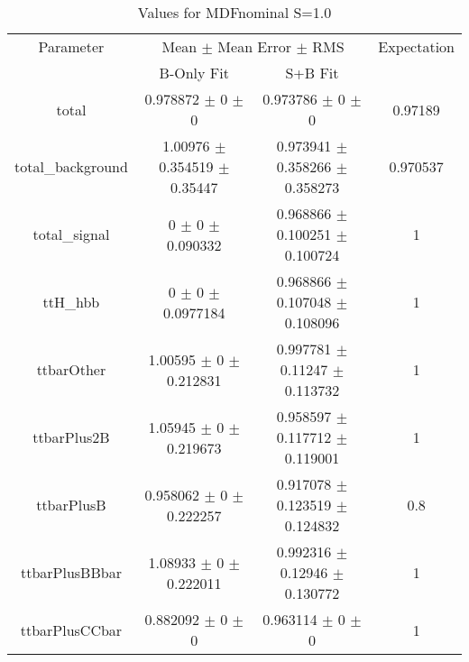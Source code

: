 \begin{table}
\centering
\caption{Values for MDFnominal S=1.0}
\begin{tabular}{cccc}
\toprule
Parameter & \multicolumn{2}{c}{Mean $\pm$ Mean Error $\pm$ RMS} & Expectation\\
 & B-Only Fit & S+B Fit & \\
\midrule
total & \num{0.978872} $\pm$ \num{0} $\pm$ \num{0} & \num{0.973786} $\pm$ \num{0} $\pm$ \num{0} & \num{0.97189}\\
total\_background & \num{1.00976} $\pm$ \num{0.354519} $\pm$ \num{0.35447} & \num{0.973941} $\pm$ \num{0.358266} $\pm$ \num{0.358273} & \num{0.970537}\\
total\_signal & \num{0} $\pm$ \num{0} $\pm$ \num{0.090332} & \num{0.968866} $\pm$ \num{0.100251} $\pm$ \num{0.100724} & \num{1}\\
ttH\_hbb & \num{0} $\pm$ \num{0} $\pm$ \num{0.0977184} & \num{0.968866} $\pm$ \num{0.107048} $\pm$ \num{0.108096} & \num{1}\\
ttbarOther & \num{1.00595} $\pm$ \num{0} $\pm$ \num{0.212831} & \num{0.997781} $\pm$ \num{0.11247} $\pm$ \num{0.113732} & \num{1}\\
ttbarPlus2B & \num{1.05945} $\pm$ \num{0} $\pm$ \num{0.219673} & \num{0.958597} $\pm$ \num{0.117712} $\pm$ \num{0.119001} & \num{1}\\
ttbarPlusB & \num{0.958062} $\pm$ \num{0} $\pm$ \num{0.222257} & \num{0.917078} $\pm$ \num{0.123519} $\pm$ \num{0.124832} & \num{0.8}\\
ttbarPlusBBbar & \num{1.08933} $\pm$ \num{0} $\pm$ \num{0.222011} & \num{0.992316} $\pm$ \num{0.12946} $\pm$ \num{0.130772} & \num{1}\\
ttbarPlusCCbar & \num{0.882092} $\pm$ \num{0} $\pm$ \num{0} & \num{0.963114} $\pm$ \num{0} $\pm$ \num{0} & \num{1}\\
\bottomrule
\end{tabular}
\end{table}